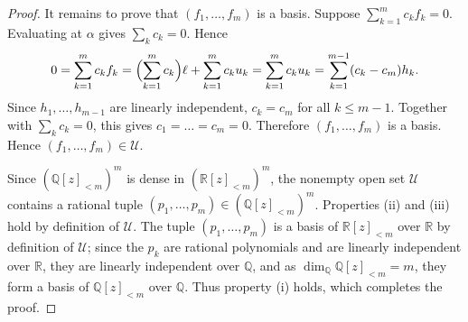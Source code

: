 \documentclass[10pt,a4paper]{amsart}
\newcommand{\PP}{\R[z]_{<m}}
\newcommand{\PQ}{\Q[z]_{<m}}
\newcommand{\Q}{\mathbb{Q}}
\newcommand{\R}{\mathbb{R}}
\begin{document}
\begin{proof}
It remains to prove that $(f_1,\dots,f_m)$ is a basis. Suppose
$\sum_{k=1}^mc_kf_k=0$. Evaluating at $\alpha$ gives $\sum_kc_k=0$. Hence
\[
0=\sum_{k=1}^mc_kf_k
=\Bigl(\sum_{k=1}^mc_k\Bigr)\ell+\sum_{k=1}^mc_ku_k
=\sum_{k=1}^mc_ku_k
=\sum_{k=1}^{m-1}(c_k-c_m)h_k .
\]
Since $h_1,\dots,h_{m-1}$ are linearly independent, $c_k=c_m$ for all
$k\leq m-1$. Together with $\sum_kc_k=0$, this gives $c_1=\dots=c_m=0$.
Therefore $(f_1,\dots,f_m)$ is a basis.
Hence $(f_1,\dots,f_m)\in\mathcal U$.

Since $(\PQ)^m$ is dense in $(\PP)^m$, the nonempty open set $\mathcal U$ contains a rational tuple $(p_1,\dots,p_m)\in(\PQ)^m$. Properties (ii) and (iii) hold by definition of $\mathcal U$. The tuple $(p_1,\dots,p_m)$ is a basis of $\PP$ over $\R$ by definition of $\mathcal U$; since the $p_k$ are rational polynomials and are linearly independent over $\R$, they are linearly independent over $\Q$, and as $\dim_\Q\PQ=m$, they form a basis of $\PQ$ over $\Q$. Thus property (i) holds, which completes the proof.
\end{proof}
\end{document}
